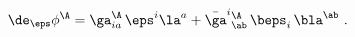 \begin{equation}
  \de_\eps \phi^\A = \ga_{ia}^\A\, \eps^i \la^a + \bar{\ga}^i{}^\A_\ab\,
  \beps_i\, \bla^\ab\ .
 \end{equation}


